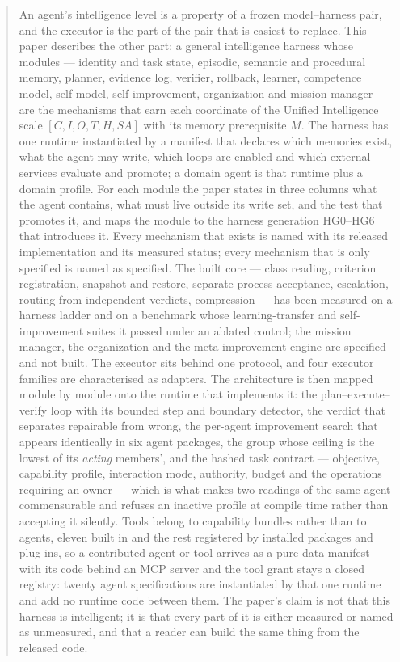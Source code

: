 \documentclass[11pt]{article}
\theoremstyle{definition}
\begin{document}
\begin{abstract}
An agent's intelligence level is a property of a frozen model--harness pair, and the executor is the part of the pair that is easiest to replace. This paper describes the other part: a general intelligence harness whose modules --- identity and task state, episodic, semantic and procedural memory, planner, evidence log, verifier, rollback, learner, competence model, self-model, self-improvement, organization and mission manager --- are the mechanisms that earn each coordinate of the Unified Intelligence scale $[C,I,O,T,H,SA]$ with its memory prerequisite $M$. The harness has one runtime instantiated by a manifest that declares which memories exist, what the agent may write, which loops are enabled and which external services evaluate and promote; a domain agent is that runtime plus a domain profile. For each module the paper states in three columns what the agent contains, what must live outside its write set, and the test that promotes it, and maps the module to the harness generation HG0--HG6 that introduces it. Every mechanism that exists is named with its released implementation and its measured status; every mechanism that is only specified is named as specified. The built core --- class reading, criterion registration, snapshot and restore, separate-process acceptance, escalation, routing from independent verdicts, compression --- has been measured on a harness ladder and on a benchmark whose learning-transfer and self-improvement suites it passed under an ablated control; the mission manager, the organization and the meta-improvement engine are specified and not built. The executor sits behind one protocol, and four executor families are characterised as adapters. The architecture is then mapped module by module onto the runtime that implements it: the plan--execute--verify loop with its bounded step and boundary detector, the verdict that separates repairable from wrong, the per-agent improvement search that appears identically in six agent packages, the group whose ceiling is the lowest of its \emph{acting} members', and the hashed task contract --- objective, capability profile, interaction mode, authority, budget and the operations requiring an owner --- which is what makes two readings of the same agent commensurable and refuses an inactive profile at compile time rather than accepting it silently. Tools belong to capability bundles rather than to agents, eleven built in and the rest registered by installed packages and plug-ins, so a contributed agent or tool arrives as a pure-data manifest with its code behind an MCP server and the tool grant stays a closed registry: twenty agent specifications are instantiated by that one runtime and add no runtime code between them. The paper's claim is not that this harness is intelligent; it is that every part of it is either measured or named as unmeasured, and that a reader can build the same thing from the released code.
\end{abstract}
\end{document}
